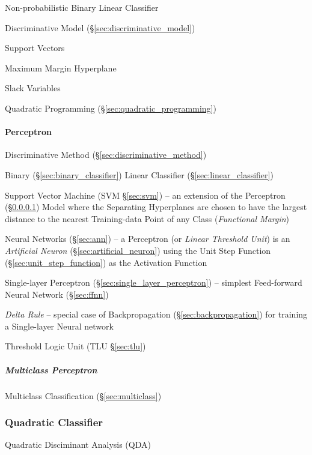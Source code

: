 Non-probabilistic Binary Linear Classifier

Discriminative Model (\S\ref{sec:discriminative_model})

Support Vectors

Maximum Margin Hyperplane

Slack Variables

Quadratic Programming (\S\ref{sec:quadratic_programming})



\paragraph{Perceptron}\label{sec:perceptron}\hfill

Discriminative Method (\S\ref{sec:discriminative_method})

Binary (\S\ref{sec:binary_classifier}) Linear Classifier
(\S\ref{sec:linear_classifier})

\fist Support Vector Machine (SVM \S\ref{sec:svm}) -- an extension of the
Perceptron (\S\ref{sec:perceptron}) Model where the Separating Hyperplanes are
chosen to have the largest distance to the nearest Training-data Point of any
Class (\emph{Functional Margin})

\fist Neural Networks (\S\ref{sec:ann}) -- a Perceptron (or \emph{Linear
  Threshold Unit}) is an \emph{Artificial Neuron}
(\S\ref{sec:artificial_neuron}) using the Unit Step Function
(\S\ref{sec:unit_step_function}) as the Activation Function

\fist Single-layer Perceptron (\S\ref{sec:single_layer_perceptron})
-- simplest Feed-forward Neural Network (\S\ref{sec:ffnn})

\emph{Delta Rule} -- special case of Backpropagation
(\S\ref{sec:backpropagation}) for training a Single-layer Neural network

\fist Threshold Logic Unit (TLU \S\ref{sec:tlu})



\subparagraph{Multiclass Perceptron}\label{sec:multiclass_perceptron}\hfill

\fist Multiclass Classification (\S\ref{sec:multiclass})



\subsubsection{Quadratic Classifier}\label{sec:quadratic_classifier}

Quadratic Disciminant Analysis (QDA)



